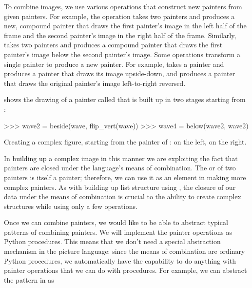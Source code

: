 To combine images, we use various operations that construct new painters from
given painters.  For example, the  operation takes two painters
and produces a new, compound painter that draws the first painter's image in
the left half of the frame and the second painter's image in the right half of
the frame.  Similarly,  takes two painters and produces a compound
painter that draws the first painter's image below the second painter's image.
Some operations transform a single painter to produce a new painter.  For
example,  takes a painter and produces a painter that draws
its image upside-down, and  produces a painter that draws the
original painter's image left-to-right reversed.

 shows the drawing of a painter called
 that is built up in two stages starting from :

\begin{codeBlock}
>>> wave2 = beside(wave, flip_vert(wave))
>>> wave4 = below(wave2, wave2)
\end{codeBlock}

\begin{imageFigure}
  {%
    Creating a complex figure, starting from the  painter of
    :  on the left,  on the right.
  }%
  \hspace{6mm}%
\end{imageFigure}

In building up a complex image in this manner we are exploiting the fact that
painters are closed under the language's means of combination.  The
 or  of two painters is itself a painter; therefore,
we can use it as an element in making more complex painters.  As with building
up list structure using , the closure of our data under the means of
combination is crucial to the ability to create complex structures while using
only a few operations.

Once we can combine painters, we would like to be able to abstract typical
patterns of combining painters.  We will implement the painter operations as
Python procedures.  This means that we don't need a special abstraction
mechanism in the picture language: since the means of combination are ordinary
Python procedures, we automatically have the capability to do anything with
painter operations that we can do with procedures.  For example, we can
abstract the pattern in  as

